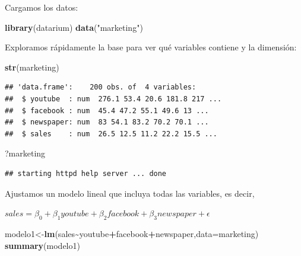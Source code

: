 \documentclass[
]{book}
\newenvironment{Shaded}{\begin{snugshade}}{\end{snugshade}}
\newcommand{\AttributeTok}[1]{\textcolor[rgb]{0.13,0.29,0.53}{#1}}
\newcommand{\FunctionTok}[1]{\textcolor[rgb]{0.13,0.29,0.53}{\textbf{#1}}}
\newcommand{\NormalTok}[1]{#1}
\newcommand{\OtherTok}[1]{\textcolor[rgb]{0.56,0.35,0.01}{#1}}
\newcommand{\SpecialCharTok}[1]{\textcolor[rgb]{0.81,0.36,0.00}{\textbf{#1}}}
\newcommand{\StringTok}[1]{\textcolor[rgb]{0.31,0.60,0.02}{#1}}
\begin{document}
Cargamos los datos:

\begin{Shaded}
\begin{Highlighting}[]
\FunctionTok{library}\NormalTok{(datarium)}
\FunctionTok{data}\NormalTok{(}\StringTok{"marketing"}\NormalTok{)}
\end{Highlighting}
\end{Shaded}

Exploramos rápidamente la base para ver qué variables contiene y la dimensión:

\begin{Shaded}
\begin{Highlighting}[]
\FunctionTok{str}\NormalTok{(marketing)}
\end{Highlighting}
\end{Shaded}

\begin{verbatim}
## 'data.frame':    200 obs. of  4 variables:
##  $ youtube  : num  276.1 53.4 20.6 181.8 217 ...
##  $ facebook : num  45.4 47.2 55.1 49.6 13 ...
##  $ newspaper: num  83 54.1 83.2 70.2 70.1 ...
##  $ sales    : num  26.5 12.5 11.2 22.2 15.5 ...
\end{verbatim}

\begin{Shaded}
\begin{Highlighting}[]
\NormalTok{?marketing}
\end{Highlighting}
\end{Shaded}

\begin{verbatim}
## starting httpd help server ... done
\end{verbatim}

Ajustamos un modelo lineal que incluya todas las variables, es decir,

\(sales=\beta_0+\beta_1 youtube+\beta_2 facebook+ \beta_3 newspaper+\epsilon\)

\begin{Shaded}
\begin{Highlighting}[]
\NormalTok{modelo1}\OtherTok{\textless{}{-}}\FunctionTok{lm}\NormalTok{(sales}\SpecialCharTok{\textasciitilde{}}\NormalTok{youtube}\SpecialCharTok{+}\NormalTok{facebook}\SpecialCharTok{+}\NormalTok{newspaper,}\AttributeTok{data=}\NormalTok{marketing)}
\FunctionTok{summary}\NormalTok{(modelo1)}
\end{Highlighting}
\end{Shaded}
\end{document}
